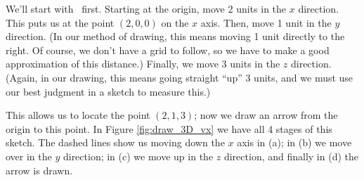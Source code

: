 {We'll start with \vv\ first. Starting at the origin, move 2 units in the $x$ direction. This puts us at the point $(2,0,0)$ on the $x$ axis. Then, move 1 unit in the $y$ direction. (In our method of drawing, this means moving 1 unit directly to the right. Of course, we don't have a grid to follow, so we have to make a good approximation of this distance.) Finally, we move 3 units in the $z$ direction. (Again, in our drawing, this means going straight ``up'' 3 units, and we must use our best judgment in a sketch to measure this.)

This allows us to locate the point $(2,1,3)$; now we draw an arrow from the origin to this point. In Figure \ref{fig:draw_3D_vx} we have all 4 stages of this sketch. The dashed lines show us moving down the $x$ axis in (a); in (b) we move over in the $y$ direction; in (c) we move up in the $z$ direction, and finally in (d) the arrow is drawn.

\begin{myfigure}
\begin{center}
\end{center}
\end{myfigure}}
